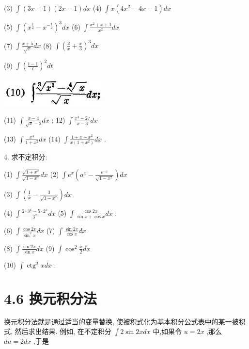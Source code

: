 \documentclass[10pt]{article}
\begin{document}
(3) \(\int \left( {{3x} + 1}\right) \left( {{2x} - 1}\right) {dx}\) (4) \(\int x\left( {4{x}^{2} - {4x} - 1}\right) {dx}\)

(5) \(\int {\left( {x}^{\frac{1}{2}} - {x}^{-\frac{1}{2}}\right) }^{3}{dx}\) (6) \(\int \frac{{x}^{2} + x + 1}{{x}^{2}}{dx}\)

(7) \(\int \frac{x + 5}{\sqrt{x}}{dx}\) (8) \(\int {\left( \frac{2}{x} + \frac{x}{3}\right) }^{3}{dx}\)

(9) \(\int {\left( \frac{t - 1}{t}\right) }^{2}{dt}\)

\begin{center}
\includegraphics[max width=0.4\textwidth]{images/01912c18-5c3f-733d-b775-749ba9897a9d_197_590705.jpg}
\end{center}

(11) \(\int \frac{x - 4}{\sqrt{x} - 2}{dx}\) ; 12) \(\int \frac{{x}^{3} - {27}}{x - 3}{dx}\)

(13) \(\int \frac{{x}^{4}}{1 + {x}^{2}}{dx}\) (14) \(\int \frac{1 + x + {x}^{2}}{x\left( {1 + {x}^{2}}\right) }{dx}\) .

4. 求不定积分:

(1) \(\int \frac{\sqrt{1 + {x}^{2}}}{\sqrt{1 - {x}^{4}}}{dx}\) (2) \(\int {e}^{x}\left( {{a}^{x} - \frac{{e}^{-x}}{\sqrt{1 - {x}^{2}}}}\right) {dx}\)

(3) \(\int \left( {\frac{1}{x} - \frac{3}{\sqrt{1 - {x}^{2}}}}\right) {dx}\)

(4) \(\int \frac{2 \cdot {3}^{x} - 5 \cdot {2}^{x}}{{3}^{x}}{dx}\) (5) \(\int \frac{\cos {2x}}{\sin x + \cos x}{dx}\) ;

(6) \(\int \frac{\cos {2x}}{{\sin }^{2}x}{dx}\) (7) \(\int \frac{\sin {2x}}{\cos x}{dx}\)

(8) \(\int \frac{\sin {2x}}{\sin x}{dx}\) (9) \(\int {\cos }^{2}\frac{x}{2}{dx}\)

(10) \(\int {\operatorname{ctg}}^{2}{xdx}\) .

\section*{4.6 换元积分法}

换元积分法就是通过适当的变量替换, 使被积式化为基本积分公式表中的某一被积式, 然后求出结果. 例如, 在不定积分 \(\int 2\sin {2xdx}\) 中,如果令 \(u = {2x}\) ,那么 \({du} = {2dx}\) ,于是
\end{document}
